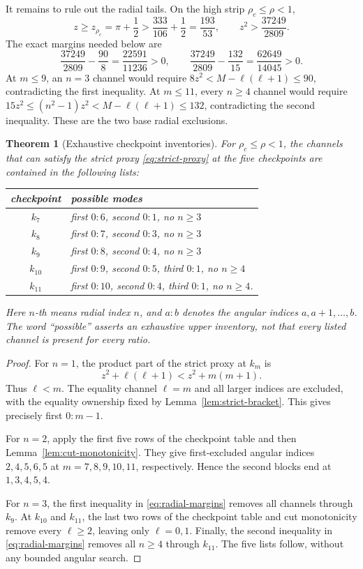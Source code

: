 \documentclass[11pt]{article}
\newtheorem{theorem}{Theorem}[section]
\theoremstyle{definition}
\theoremstyle{remark}
\newcommand{\rhoc}{\rho_{c}}
\begin{document}
It remains to rule out the radial tails.  On the high strip
\(\rhoc\leq\rho<1\),
\[
 z\geq z_{\rhoc}=\pi+\frac12>
 \frac{333}{106}+\frac12=\frac{193}{53},
 \qquad
 z^2>\frac{37249}{2809}.
\]
The exact margins needed below are
\begin{equation}
 \frac{37249}{2809}-\frac{90}{8}
 =\frac{22591}{11236}>0,
 \qquad
 \frac{37249}{2809}-\frac{132}{15}
 =\frac{62649}{14045}>0.
 \label{eq:radial-margins}
\end{equation}
At \(m\leq9\), an \(n=3\) channel would require
\(8z^2<M-\ell(\ell+1)\leq90\), contradicting the first inequality.
At \(m\leq11\), every \(n\geq4\) channel would require
\(15z^2\leq(n^2-1)z^2<M-\ell(\ell+1)\leq132\), contradicting the
second inequality.  These are the two base radial exclusions.

\begin{theorem}[Exhaustive checkpoint inventories]
\label{thm:inventories}
For \(\rhoc\leq\rho<1\), the channels that can satisfy the strict proxy
\eqref{eq:strict-proxy} at the five checkpoints are contained in the
following lists:
\begin{center}
\begin{tabular}{c|l}
checkpoint&possible modes\\ \hline
\(k_7\)&first \(0{:}6\), second \(0{:}1\), no \(n\geq3\)\\
\(k_8\)&first \(0{:}7\), second \(0{:}3\), no \(n\geq3\)\\
\(k_9\)&first \(0{:}8\), second \(0{:}4\), no \(n\geq3\)\\
\(k_{10}\)&first \(0{:}9\), second \(0{:}5\), third \(0{:}1\), no \(n\geq4\)\\
\(k_{11}\)&first \(0{:}10\), second \(0{:}4\), third \(0{:}1\), no \(n\geq4\).
\end{tabular}
\end{center}
Here \(n\)-th means radial index \(n\), and \(a{:}b\) denotes the angular
indices \(a,a+1,\ldots,b\).  The word ``possible'' asserts an exhaustive
upper inventory, not that every listed channel is present for every ratio.
\end{theorem}

\begin{proof}
For \(n=1\), the product part of the strict proxy at \(k_m\) is
\[
 z^2+\ell(\ell+1)<z^2+m(m+1).
\]
Thus \(\ell<m\).  The equality channel \(\ell=m\) and all larger
indices are excluded, with the equality ownership fixed by
Lemma~\ref{lem:strict-bracket}.  This gives precisely first
\(0{:}m-1\).

For \(n=2\), apply the first five rows of the checkpoint table and then
Lemma~\ref{lem:cut-monotonicity}.  They give first-excluded angular indices
\(2,4,5,6,5\) at \(m=7,8,9,10,11\), respectively.  Hence the second
blocks end at \(1,3,4,5,4\).

For \(n=3\), the first inequality in \eqref{eq:radial-margins} removes
all channels through \(k_9\).  At \(k_{10}\) and \(k_{11}\), the last
two rows of the checkpoint table and cut monotonicity remove every
\(\ell\geq2\), leaving only \(\ell=0,1\).  Finally, the second
inequality in \eqref{eq:radial-margins} removes all \(n\geq4\) through
\(k_{11}\).  The five lists follow, without any bounded angular search.
\end{proof}
\end{document}
